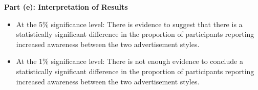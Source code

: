 \documentclass{article}
\begin{document}
\textbf{Part (e): Interpretation of Results}

\begin{itemize}
    \item At the 5\% significance level: There is evidence to suggest that there is a statistically significant difference in the proportion of participants reporting increased awareness between the two advertisement styles.
    \item At the 1\% significance level: There is not enough evidence to conclude a statistically significant difference in the proportion of participants reporting increased awareness between the two advertisement styles.
\end{itemize}
\end{document}
